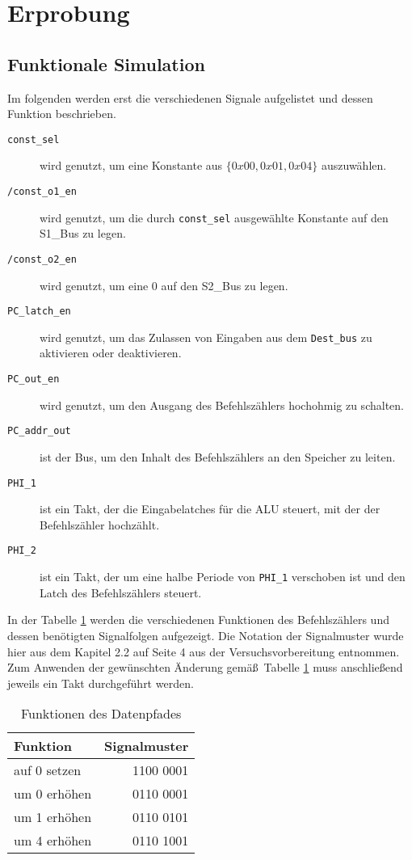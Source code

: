 \documentclass[12pt,a4paper]{scrartcl}
\begin{document}
\section{Erprobung}

\subsection{Funktionale Simulation}
Im folgenden werden erst die verschiedenen Signale aufgelistet und dessen Funktion beschrieben.
\begin{description}
\item [\texttt{const\_sel}] wird genutzt, um eine Konstante aus $\{0x00, 0x01, 0x04\}$ auszuw\"ahlen.
\item [\texttt{/const\_o1\_en}] wird genutzt, um die durch \texttt{const\_sel} ausgew\"ahlte Konstante auf den S1\_Bus zu legen.
\item [\texttt{/const\_o2\_en}] wird genutzt, um eine 0 auf den S2\_Bus zu legen.
\item [\texttt{PC\_latch\_en}] wird genutzt, um das Zulassen von Eingaben aus dem \texttt{Dest\_bus} zu aktivieren oder deaktivieren.
\item [\texttt{PC\_out\_en}] wird genutzt, um den Ausgang des Befehlsz\"ahlers hochohmig zu schalten.
\item [\texttt{PC\_addr\_out}] ist der Bus, um den Inhalt des Befehlsz\"ahlers an den Speicher zu leiten.
\item [\texttt{PHI\_1}] ist ein Takt, der die Eingabelatches f\"ur die ALU steuert, mit der der Befehlsz\"ahler hochz\"ahlt.
\item [\texttt{PHI\_2}] ist ein Takt, der um eine halbe Periode von \texttt{PHI\_1} verschoben ist und den Latch des Befehlsz\"ahlers steuert.
\end{description}

In der Tabelle \ref{funktion} werden die verschiedenen Funktionen des Befehlsz\"ahlers und dessen ben\"otigten Signalfolgen aufgezeigt.
Die Notation der Signalmuster wurde hier aus dem Kapitel 2.2 auf Seite 4 aus der Versuchsvorbereitung entnommen.
Zum Anwenden der gew\"unschten \"Anderung gem\"a\ss \ Tabelle \ref{funktion} muss anschlie\ss end jeweils ein Takt durchgef\"uhrt werden.

\begin{table}[h]
    \centering
    \begin{tabular}{l|r}
    \hline
    Funktion       & Signalmuster \\
    \hline
    auf 0 setzen   & 1100 0001 \\
    um 0 erh\"ohen & 0110 0001 \\
    um 1 erh\"ohen & 0110 0101 \\
    um 4 erh\"ohen & 0110 1001 \\
    \hline
    \end{tabular}
    \caption{Funktionen des Datenpfades}
    \label{funktion}
\end{table}
\end{document}
